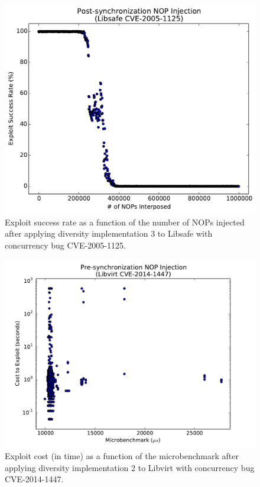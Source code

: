 \begin{figure}
	\centering
	\includegraphics[width=\columnwidth]{figures/libsafe-post}
	\caption{Exploit success rate as a function of the number of NOPs injected after applying diversity implementation 3 to Libsafe with concurrency bug CVE-2005-1125.}
	\label{fig_libsafe-post}
\end{figure}

\begin{figure}
	\centering
	\includegraphics[width=\columnwidth]{figures/libvirt-pre}
\caption{Exploit cost (in time) as a function of the microbenchmark after applying diversity implementation 2 to Libvirt with concurrency bug CVE-2014-1447.}
	\label{fig_libvirt-pre}
\end{figure}

